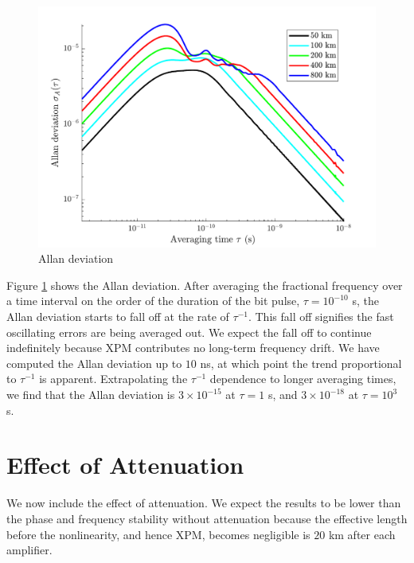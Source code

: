 %
\begin{figure}[htb]
	\centering
	\includegraphics[scale=0.9]{img/NAAllanDev}
	\caption{Allan deviation} \label{fig:NAAllanDev}
\end{figure}
%
Figure \ref{fig:NAAllanDev} shows the Allan deviation. After averaging the fractional frequency over a time interval on the order of the duration of the bit pulse, $\tau = 10^{-10}$ s, the Allan deviation starts to fall off at the rate of $\tau^{-1}$. This fall off signifies the fast oscillating errors are being averaged out. We expect the fall off to continue indefinitely because XPM contributes no long-term frequency drift. We have computed the Allan deviation up to $10$ ns, at which point the trend proportional to $\tau^{-1}$ is apparent. Extrapolating the $\tau^{-1}$ dependence to longer averaging times, we find that the Allan deviation is $3\times 10^{-15}$ at $\tau = 1$ s, and $3\times 10^{-18}$ at $\tau=10^3$ s.

\section{Effect of Attenuation}

We now include the effect of attenuation. We expect the results to be lower than the phase and frequency stability without attenuation because the effective length before the nonlinearity, and hence XPM, becomes negligible is $20$ km after each amplifier.

